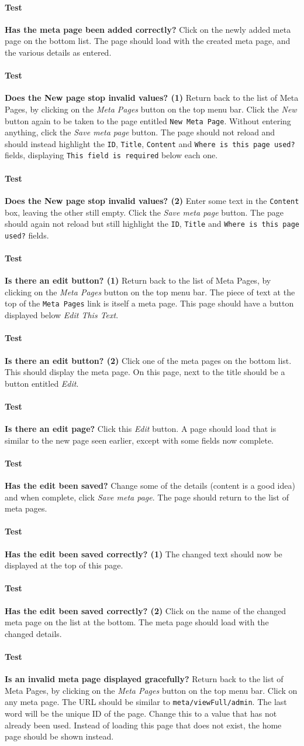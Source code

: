 \documentclass[12pt]{article}
\newcounter{Test}
\newcommand{\test}[1]{%
\stepcounter{Test}%
\paragraph{Test \theTest} \textbf{#1} }
\begin{document}
\test{Has the meta page been added correctly?}
Click on the newly added meta page on the bottom list. The page should load with the created meta page, and the various details as entered.

\test{Does the New page stop invalid values? (1)}
Return back to the list of Meta Pages, by clicking on the \textit{Meta Pages} button on the top menu bar. Click the \textit{New} button again to be taken to the page entitled \texttt{New Meta Page}. Without entering anything, click the \textit{Save meta page} button. The page should not reload and should instead highlight the \texttt{ID}, \texttt{Title}, \texttt{Content} and \texttt{Where is this page used?} fields, displaying \texttt{This field is required} below each one. 

\test{Does the New page stop invalid values? (2)}
Enter some text in the \texttt{Content} box, leaving the other still empty. Click the \textit{Save meta page} button. The page should again not reload but still highlight the \texttt{ID}, \texttt{Title} and \texttt{Where is this page used?} fields.

\test{Is there an edit button? (1)}
Return back to the list of Meta Pages, by clicking on the \textit{Meta Pages} button on the top menu bar. The piece of text at the top of the \texttt{Meta Pages} link is itself a meta page. This page should have a button displayed below \textit{Edit This Text}.

\test{Is there an edit button? (2)}
Click one of the meta pages on the bottom list. This should display the meta page. On this page, next to the title should be a button entitled \textit{Edit}.

\test{Is there an edit page?}
Click this \textit{Edit} button. A page should load that is similar to the new page seen earlier, except with some fields now complete.

\test{Has the edit been saved?}
Change some of the details (content is a good idea) and when complete, click \textit{Save meta page}. The page should return to the list of meta pages.

\test{Has the edit been saved correctly? (1)}
The changed text should now be displayed at the top of this page.

\test{Has the edit been saved correctly? (2)}
Click on the name of the changed meta page on the list at the bottom. The meta page should load with the changed details.

\test{Is an invalid meta page displayed gracefully?}
Return back to the list of Meta Pages, by clicking on the \textit{Meta Pages} button on the top menu bar. Click on any meta page. The URL should be similar to \texttt{meta/viewFull/admin}. The last word will be the unique ID of the page. Change this to a value that has not already been used. Instead of loading this page that does not exist, the home page should be shown instead.
\end{document}
